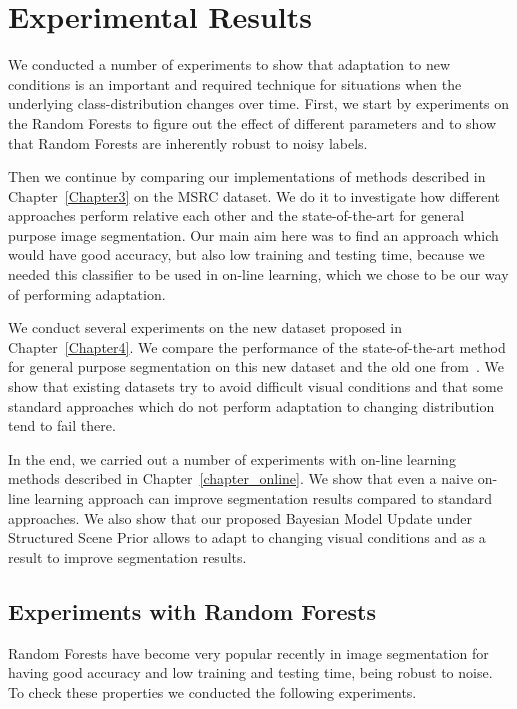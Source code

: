 \chapter{Experimental Results}
\label{Chapter5}

We conducted a number of experiments to show that adaptation to new conditions is an important and required technique for situations when the underlying
class-distribution changes over time. First, we start by experiments on the Random Forests to figure out the effect of different parameters
and to show that Random Forests are inherently robust to noisy labels.

Then we continue by comparing our implementations of methods described in Chapter~\ref{Chapter3} on the MSRC dataset. We do it to investigate
how different approaches perform relative each other and the state-of-the-art for general purpose image segmentation. Our main aim here
was to find an approach which would have good accuracy, but also low training and testing time, because we needed this classifier to be used in
on-line learning, which we chose to be our way of performing adaptation.

We conduct several experiments on the new dataset proposed in Chapter~\ref{Chapter4}. We compare the performance of the state-of-the-art method
for general purpose segmentation on this new dataset and the old one from~\cite{Wojek2008}. We show that existing datasets try to avoid difficult
visual conditions and that some standard approaches which do not perform adaptation to changing distribution tend to fail there.

In the end, we carried out a number of experiments with on-line learning methods described in Chapter~\ref{chapter_online}. We show that even
a naive on-line learning approach can improve segmentation results compared to standard approaches. We also show that our proposed
Bayesian Model Update under Structured Scene Prior allows to adapt to changing visual conditions and as a result to improve segmentation results.

\section{Experiments with Random Forests}
Random Forests have become very popular recently in image segmentation \cite{Brostow2008, Shotton2008, Kontschieder2011} for having good accuracy
and low training and testing time, being robust to noise. To check these properties we conducted the following experiments.

